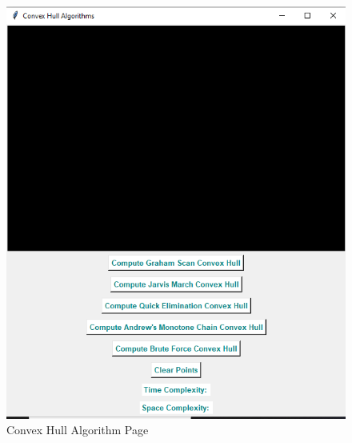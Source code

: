 \begin{figure}
    \centering
    \includegraphics[width=1\linewidth]{p2.PNG}
    \caption{Convex Hull Algorithm Page}
    \label{fig:enter-label}
\end{figure}

